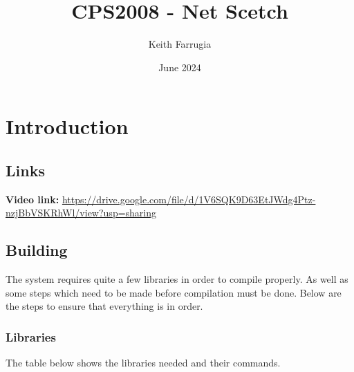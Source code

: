 \documentclass[12pt, a4paper]{report}
\title{CPS2008 - Net Scetch}
\author{Keith Farrugia}
\date{June 2024}
\begin{document}
\maketitle
\tableofcontents



\chapter{Introduction}
\section{Links}

\textbf{Video link:} \url{https://drive.google.com/file/d/1V6SQK9D63EtJWdg4Ptz-nzjBbVSKRhWl/view?usp=sharing}

\section{Building}
The system requires quite a few libraries in order to compile properly. As well as some steps which need to be made before compilation must be done. Below are the steps to ensure that everything is in order.

\subsection{Libraries}
The table below shows the libraries needed and their commands.
\end{document}
